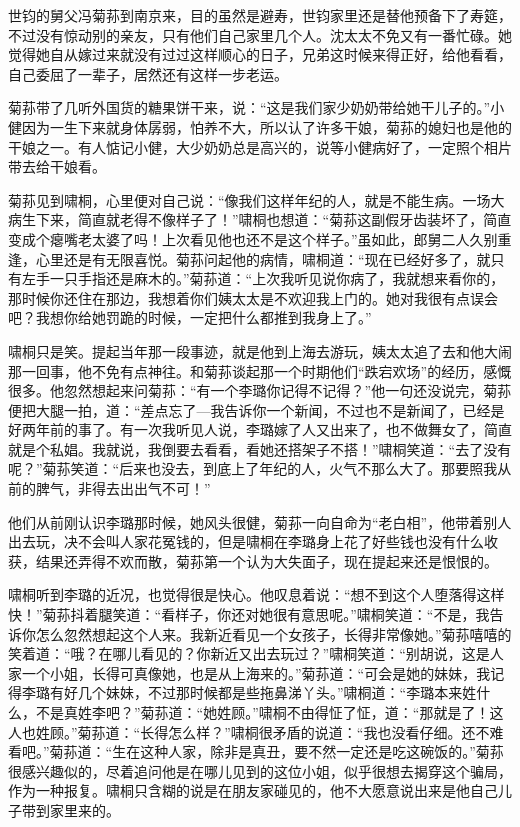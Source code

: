 \par 世钧的舅父冯菊荪到南京来，目的虽然是避寿，世钧家里还是替他预备下了寿筵，不过没有惊动别的亲友，只有他们自己家里几个人。沈太太不免又有一番忙碌。她觉得她自从嫁过来就没有过过这样顺心的日子，兄弟这时候来得正好，给他看看，自己委屈了一辈子，居然还有这样一步老运。
\par 菊荪带了几听外国货的糖果饼干来，说：“这是我们家少奶奶带给她干儿子的。”小健因为一生下来就身体孱弱，怕养不大，所以认了许多干娘，菊荪的媳妇也是他的干娘之一。有人惦记小健，大少奶奶总是高兴的，说等小健病好了，一定照个相片带去给干娘看。
\par 菊荪见到啸桐，心里便对自己说：“像我们这样年纪的人，就是不能生病。一场大病生下来，简直就老得不像样子了！”啸桐也想道：“菊荪这副假牙齿装坏了，简直变成个瘪嘴老太婆了吗！上次看见他也还不是这个样子。”虽如此，郎舅二人久别重逢，心里还是有无限喜悦。菊荪问起他的病情，啸桐道：“现在已经好多了，就只有左手一只手指还是麻木的。”菊荪道：“上次我听见说你病了，我就想来看你的，那时候你还住在那边，我想着你们姨太太是不欢迎我上门的。她对我很有点误会吧？我想你给她罚跪的时候，一定把什么都推到我身上了。”
\par 啸桐只是笑。提起当年那一段事迹，就是他到上海去游玩，姨太太追了去和他大闹那一回事，他不免有点神往。和菊荪谈起那一个时期他们“跌宕欢场”的经历，感慨很多。他忽然想起来问菊荪：“有一个李璐你记得不记得？”他一句还没说完，菊荪便把大腿一拍，道：“差点忘了—我告诉你一个新闻，不过也不是新闻了，已经是好两年前的事了。有一次我听见人说，李璐嫁了人又出来了，也不做舞女了，简直就是个私娼。我就说，我倒要去看看，看她还搭架子不搭！”啸桐笑道：“去了没有呢？”菊荪笑道：“后来也没去，到底上了年纪的人，火气不那么大了。那要照我从前的脾气，非得去出出气不可！”
\par 他们从前刚认识李璐那时候，她风头很健，菊荪一向自命为“老白相”，他带着别人出去玩，决不会叫人家花冤钱的，但是啸桐在李璐身上花了好些钱也没有什么收获，结果还弄得不欢而散，菊荪第一个认为大失面子，现在提起来还是恨恨的。
\par 啸桐听到李璐的近况，也觉得很是快心。他叹息着说：“想不到这个人堕落得这样快！”菊荪抖着腿笑道：“看样子，你还对她很有意思呢。”啸桐笑道：“不是，我告诉你怎么忽然想起这个人来。我新近看见一个女孩子，长得非常像她。”菊荪嘻嘻的笑着道：“哦？在哪儿看见的？你新近又出去玩过？”啸桐笑道：“别胡说，这是人家一个小姐，长得可真像她，也是从上海来的。”菊荪道：“可会是她的妹妹，我记得李璐有好几个妹妹，不过那时候都是些拖鼻涕丫头。”啸桐道：“李璐本来姓什么，不是真姓李吧？”菊荪道：“她姓顾。”啸桐不由得怔了怔，道：“那就是了！这人也姓顾。”菊荪道：“长得怎么样？”啸桐很矛盾的说道：“我也没看仔细。还不难看吧。”菊荪道：“生在这种人家，除非是真丑，要不然一定还是吃这碗饭的。”菊荪很感兴趣似的，尽着追问他是在哪儿见到的这位小姐，似乎很想去揭穿这个骗局，作为一种报复。啸桐只含糊的说是在朋友家碰见的，他不大愿意说出来是他自己儿子带到家里来的。
